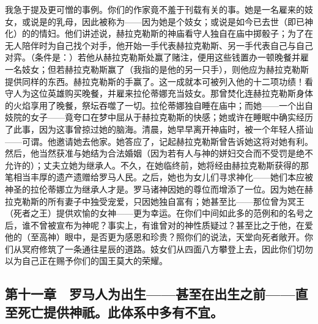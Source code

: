 我急于提及更可憎的事例。你们的作家竟不羞于刊载有关的事。她是一名雇来的妓女，或说是的乳母，因此被称为——因为她是个妓女；或说是如今已去世（即已神化）的的情妇。他们讲述说，赫拉克勒斯的神庙看守人独自在庙中掷骰子；为了在无人陪伴时为自己找个对手，他开始一手代表赫拉克勒斯、另一手代表自己与自己对弈。（条件是：）若他从赫拉克勒斯处赢了赌注，便用这些钱置办一顿晚餐并雇一名妓女；但若赫拉克勒斯赢了（我指的是他的另一只手），则他应为赫拉克勒斯提供同样的东西。赫拉克勒斯的手赢了。这一成就本可被列入他的十二项功绩！看守人为这位英雄购买晚餐，并雇来拉伦蒂娜充当妓女。那曾焚化连赫拉克勒斯身体的火焰享用了晚餐，祭坛吞噬了一切。拉伦蒂娜独自睡在庙中；而她——一个出自妓院的女子——竟夸口在梦中屈从于赫拉克勒斯的快感；她或许在睡眠中确实经历了此事，因为这事曾掠过她的脑海。清晨，她早早离开神庙时，被一个年轻人搭讪——可谓。他邀请她去他家。她答应了，记起赫拉克勒斯曾告诉她这将对她有利。然后，他当然获准与她结为合法婚姻（因为若有人与神的姘妇交合而不受罚是绝不允许的）；丈夫立她为继承人。不久，在她临终前，她将经由赫拉克勒斯获得的那笔相当丰厚的遗产遗赠给罗马人民。之后，她也为女儿们寻求神化——她们本应被神圣的拉伦蒂娜立为继承人才是。罗马诸神因她的尊位而增添了一位。因为她在赫拉克勒斯的所有妻子中独受宠爱，只因她独自富有；她甚至比——那位曾为冥王（死者之王）提供欢愉的女神——更为幸运。在你们中间如此多的范例和的名号之后，谁不曾被宣布为神呢？事实上，有谁曾对的神性质疑过？甚至比之于他，在爱他的（至高神）眼中，是否更为感恩和珍贵？照你们的说法，天堂向死者敞开。你们从冥府修筑了一条通往星辰的道路。妓女们从四面八方攀登上去，因此你们切勿以为自己正在赐予你们的国王莫大的荣耀。\par


\subsection{第十一章　罗马人为出生——甚至在出生之前——直至死亡提供神祇。此体系中多有不宜。}


